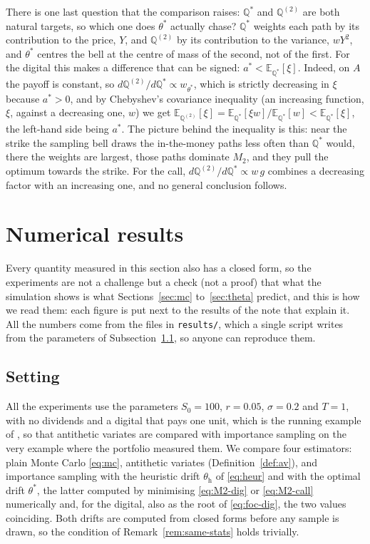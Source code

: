 \documentclass[11pt,a4paper]{article}
\theoremstyle{plain}
\theoremstyle{definition}
\theoremstyle{remark}
\newcommand{\E}{\mathbb{E}}
\newcommand{\Q}{\mathbb{Q}}
\newcommand{\1}{\mathbf{1}}
\begin{document}
There is one last question that the comparison raises: $\Q^*$ and $\Q^{(2)}$ are both natural targets, so which one does $\theta^*$ actually chase? $\Q^*$ weights each path by its contribution to the price, $Y$, and $\Q^{(2)}$ by its contribution to the variance, $wY^2$, and $\theta^*$ centres the bell at the centre of mass of the second, not of the first. For the digital this makes a difference that can be signed: $a^* < \E_{\Q^*}[\xi]$. Indeed, on $A$ the payoff is constant, so $d\Q^{(2)}/d\Q^* \propto w_{\theta^*}$, which is strictly decreasing in $\xi$ because $a^* > 0$, and by Chebyshev's covariance inequality (an increasing function, $\xi$, against a decreasing one, $w$) we get $\E_{\Q^{(2)}}[\xi] = \E_{\Q^*}[\xi w]/\E_{\Q^*}[w] < \E_{\Q^*}[\xi]$, the left-hand side being $a^*$. The picture behind the inequality is this: near the strike the sampling bell draws the in-the-money paths less often than $\Q^*$ would, there the weights are largest, those paths dominate $M_2$, and they pull the optimum towards the strike. For the call, $d\Q^{(2)}/d\Q^* \propto w\, g$ combines a decreasing factor with an increasing one, and no general conclusion follows.



\section{Numerical results}
\label{sec:results}

Every quantity measured in this section also has a closed form, so the experiments are not a challenge but a check (not a proof) that what the simulation shows is what Sections~\ref{sec:mc} to~\ref{sec:theta} predict, and this is how we read them: each figure is put next to the results of the note that explain it. All the numbers come from the files in \texttt{results/}, which a single script writes from the parameters of Subsection~\ref{subsec:setting}, so anyone can reproduce them.

\subsection{Setting}
\label{subsec:setting}

All the experiments use the parameters $S_0 = 100$, $r = 0.05$, $\sigma = 0.2$ and $T = 1$, with no dividends and a digital that pays one unit, which is the running example of \cite{portfolio}, so that antithetic variates are compared with importance sampling on the very example where the portfolio measured them. We compare four estimators: plain Monte Carlo \eqref{eq:mc}, antithetic variates (Definition~\ref{def:av}), and importance sampling with the heuristic drift $\theta_{\mathrm h}$ of \eqref{eq:heur} and with the optimal drift $\theta^*$, the latter computed by minimising \eqref{eq:M2-dig} or \eqref{eq:M2-call} numerically and, for the digital, also as the root of \eqref{eq:foc-dig}, the two values coinciding. Both drifts are computed from closed forms before any sample is drawn, so the condition of Remark~\ref{rem:same-stats} holds trivially.
\end{document}
